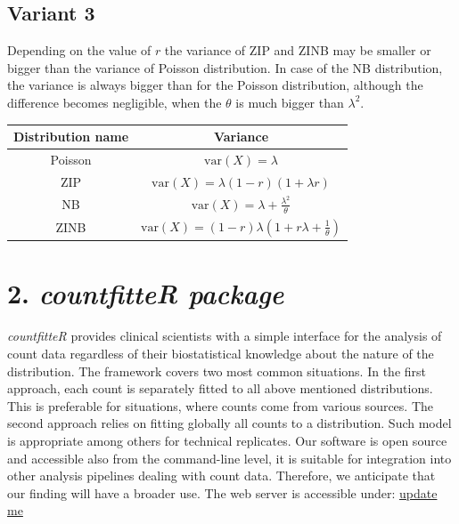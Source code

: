 \subsection{Variant 3}

Depending on the value of $r$ the variance of ZIP and ZINB may be smaller or bigger than the variance of Poisson distribution. In case of the NB distribution, the variance is always bigger than for the Poisson distribution, although the difference becomes negligible, when the $\theta$ is much bigger than $\lambda^2$.

\begin{center}
\begin{tabular}{ |c|c| } 
\hline
\bfseries Distribution name & \bfseries Variance \\
\hline
Poisson & $\textrm{var}(X) = \lambda $ \\
\hline
ZIP & $\textrm{var}(X) = \lambda (1 - r)(1 + \lambda r)$ \\
\hline
NB & $\textrm{var}(X) = \lambda + \frac{\lambda^2}{\theta} $ \\
\hline
ZINB & $\textrm{var}(X) = (1 - r) \lambda \left( 1 + r\lambda  + \frac{1}{\theta} \right)$ \\
\hline
\end{tabular}
\end{center}


\section{2. \emph{countfitteR package}}


\emph{countfitteR} provides clinical scientists with a simple interface for the analysis of count data regardless of their biostatistical knowledge about the nature of the distribution. The framework covers two most common situations. In the first approach, each count is separately fitted to all above mentioned distributions. This is preferable for situations, where counts come from various sources. The second approach relies on fitting globally all counts to a distribution. Such model is appropriate among others for technical replicates.
Our software is open source and accessible also from the command-line level, it is suitable for integration into other analysis pipelines dealing with count data. Therefore, we anticipate that our finding will have a broader use. 
The web server is accessible under: 
\url{update me}


